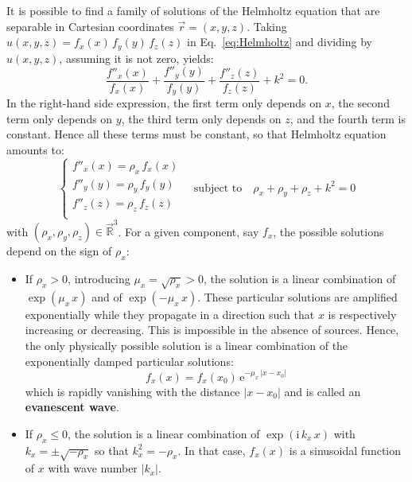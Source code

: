 \documentclass[a4paper]{article}
\newcommand*{\mathe}{\mathrm{e}}
\newcommand*{\mathi}{\mathrm{i}}
\begin{document}
It is possible to find a family of solutions of the Helmholtz equation that are
separable in Cartesian coordinates $\vec{r} = (x,y,z)$. Taking
$u(x,y,z) = f_{x}(x)\,f_{y}(y)\,f_{z}(z)$ in Eq.~\eqref{eq:Helmholtz} and
dividing by $u(x,y,z)$, assuming it is not zero, yields:
\begin{displaymath}
  \frac{f''_{x}(x)}{f_{x}(x)} +
  \frac{f''_{y}(y)}{f_{y}(y)} +
  \frac{f''_{z}(z)}{f_{z}(z)} + k^{2} = 0.
\end{displaymath}
In the right-hand side expression, the first term only depends on $x$, the
second term only depends on $y$, the third term only depends on $z$, and the
fourth term is constant. Hence all these terms must be constant, so that
Helmholtz equation amounts to:
\begin{displaymath}
  \begin{cases}
    f''_{x}(x) = \rho_{x}\,f_{x}(x)\\
    f''_{y}(y) = \rho_{y}\,f_{y}(y)\\
    f''_{z}(z) = \rho_{z}\,f_{z}(z)\\
  \end{cases}
  \quad\text{subject to}\quad
  \rho_{x} + \rho_{y} + \rho_{z} + k^{2} = 0
\end{displaymath}
with $(\rho_{x},\rho_{y},\rho_{z}) ∈ \mathbb{\vec{R}}^{3}$. For a given
component, say $f_{x}$, the possible solutions depend on the sign
of $\rho_{x}$:
\begin{itemize}
\item If $\rho_{x} > 0$, introducing $μ_{x} = \sqrt{\rho_{x}} > 0$, the
      solution is a linear combination of $\exp(μ_{x}\,x)$ and of
      $\exp(-μ_{x}\,x)$. These particular solutions are amplified exponentially
      while they propagate in a direction such that $x$ is respectively
      increasing or decreasing. This is impossible in the absence of sources.
      Hence, the only physically possible solution is a linear combination of
      the exponentially damped particular solutions:
      \begin{displaymath}
        f_{x}(x) = f_{x}(x_{0})\,\mathe^{-μ_{x}\,|x - x_{0}|}
      \end{displaymath}
      which is rapidly vanishing with the distance $|x - x_{0}|$ and is called
      an \textbf{evanescent wave}.

\item If $\rho_{x} ≤ 0$, the solution is a linear combination of
      $\exp(\mathi\,k_{x}\,x)$ with $k_{x} = ±\sqrt{-\rho_{x}}$ so that
      $k_{x}^{2} = -\rho_{x}$. In that case, $f_{x}(x)$ is a sinusoidal
      function of $x$ with wave number $|k_{x}|$.
\end{itemize}
\end{document}
